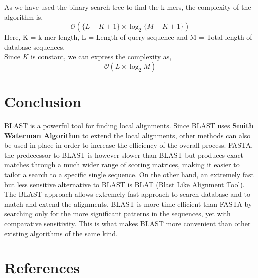 \documentclass[12pt, a4paper]{report}
\begin{document}
As we have used the binary search tree to find the k-mers, the complexity of the algorithm is, $$\mathcal{O}(\{L-K+1\}\times\log_{2}\{M-K+1\})$$ Here, K = k-mer length, L = Length of query sequence and M = Total length of database sequences. \\
Since $K$ is constant, we can express the complexity as, $$\mathcal{O}(L\times\log_{2}M)$$


\chapter{Conclusion}
BLAST is a powerful tool for finding local alignments. Since BLAST uses \textbf{Smith Waterman Algorithm} to extend the local alignments, other methods can also be used in place in order to increase the efficiency of the overall process. FASTA, the predecessor to BLAST is however slower than BLAST but produces exact matches through a much wider range of scoring matrices, making it easier to tailor a search to a specific single sequence. On the other hand, an extremely fast but less sensitive alternative to BLAST is BLAT (Blast Like Alignment Tool). \\

The BLAST approach allows extremely fast approach to search database and to match and extend the alignments. BLAST is more time-efficient than FASTA by searching only for the more significant patterns in the sequences, yet with comparative sensitivity. This is what makes BLAST more convenient than other existing algorithms of the same kind.

\chapter*{References}
\end{document}
